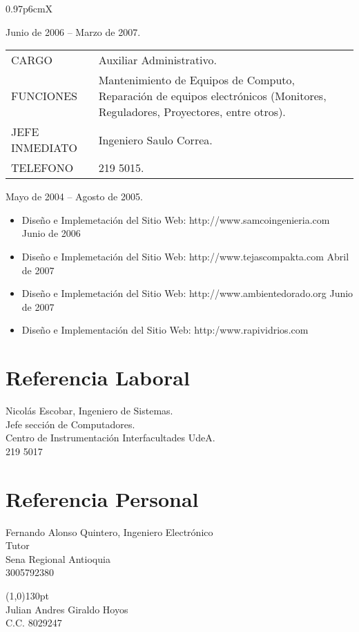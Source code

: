 \documentclass[a4paper, oneside, final, letter]{scrartcl}
\begin{document}
\begin{center}
\begin{tabularx}{0.97\linewidth}{p{6cm}X}
\end{tabularx}
Junio de 2006 – Marzo de 2007.\\
\vspace{10pt}
\begin{tabularx}{0.97\linewidth}{p{6cm}X}
CARGO & Auxiliar Administrativo.\\
FUNCIONES & Mantenimiento de Equipos de Computo, Reparaci\'on de equipos electr\'onicos (Monitores, Reguladores, Proyectores, entre otros).\\
JEFE INMEDIATO & Ingeniero Saulo Correa.\\
TELEFONO & 219 5015.\\
\end{tabularx}
Mayo de 2004 – Agosto de 2005.\\
\begin{itemize}
\item Diseño e Implemetaci\'on del Sitio Web: http://www.samcoingenieria.com
Junio de 2006

\item Diseño e Implemetaci\'on del Sitio Web: http://www.tejascompakta.com
Abril de 2007

\item Diseño e Implemetaci\'on del Sitio Web: http://www.ambientedorado.org
Junio de 2007

\item Diseño e Implementaci\'on del Sitio Web: http:/www.rapividrios.com
\end{itemize}

\section{Referencia Laboral}
\begin{flushleft}
Nicol\'as Escobar, Ingeniero de Sistemas.\\
Jefe sección de Computadores.\\
Centro de Instrumentación Interfacultades UdeA.\\
219 5017\\
\end{flushleft}

\section{Referencia Personal}
\begin{flushleft}
Fernando Alonso Quintero, Ingeniero Electr\'onico\\
Tutor\\
Sena Regional Antioquia\\
3005792380
\end{flushleft}
\end{center}

\vspace{200pt}
\line(1,0){130pt}\\
\large Julian Andres Giraldo Hoyos\\
\large C.C. 8029247
\end{document}
